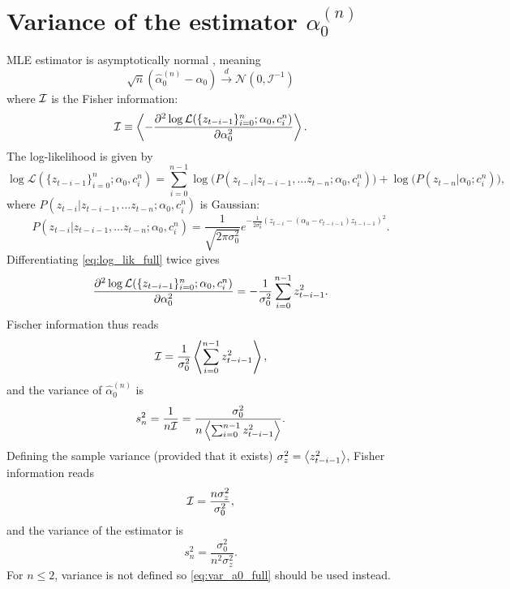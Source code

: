 \documentclass[FinalReport.tex]{subfiles}
\begin{document}
\section{Variance of the estimator ${\alpha}_0^{(n)}$}\label{app:var_a0}
MLE estimator is asymptotically normal \cite{CoxHink74}, meaning
\begin{equation}
	\sqrt{n}(\hat{\alpha}_0^{(n)}-\alpha_0)\stackrel{d}{\rightarrow}\mathcal{N}(0,\mathcal{I}^{-1})
\end{equation}
where $\mathcal{I}$ is the Fisher information:
\begin{equation}
	\mathcal{I}\equiv\expval{-\pdv[2]{\log{\mathcal{L}(\{z_{t-i-1}\}_{i=0}^n;\alpha_0,c_i^n)}}{\alpha_0} }.
\end{equation}
The log-likelihood is given by %
\begin{equation}\label{eq:log_lik_full}
	\log{\mathcal{L}(\{z_{t-i-1}\}_{i=0}^n;\alpha_0,c_i^n)}=\sum_{i=0}^{n-1}\log\bigl(P(z_{t-i}\vert z_{t-i-1},\dots z_{t-n};\alpha_0,c_i^n)\bigr) + \log\bigl(P(z_{t-n}\vert \alpha_0;c_i^n)\bigr),	
\end{equation}
where $P(z_{t-i}\vert z_{t-i-1},\dots z_{t-n};\alpha_0,c_i^n)$ is Gaussian:
\begin{equation}
	P(z_{t-i}\vert z_{t-i-1},\dots z_{t-n};\alpha_0,c_i^n)=\frac{1}{\sqrt{2\pi\sigma_0^2}}e^{-\frac{1}{2\sigma_0^2}(z_{t-i}-(\alpha_0-c_{t-i-1})z_{t-i-1})^2}.
\end{equation}
Differentiating \eqref{eq:log_lik_full} twice gives
\begin{equation}
	\pdv[2]{\log{\mathcal{L}(\{z_{t-i-1}\}_{i=0}^n;\alpha_0,c_i^n)}}{\alpha_0}=-\frac{1}{\sigma_0^2}\sum_{i=0}^{n-1}z_{t-i-1}^2.
\end{equation}
Fischer information thus reads
\begin{equation}
\mathcal{I}=\frac{1}{\sigma_0^2}\expval{\sum_{i=0}^{n-1}z_{t-i-1}^2},	
\end{equation}
and the variance of $\hat{\alpha}_0^{(n)}$ is 
\begin{equation}\label{eq:var_a0_full}
s_n^2=\frac{1}{n\mathcal{I}}=\frac{\sigma_0^2}{n\expval{\sum_{i=0}^{n-1}z_{t-i-1}^2}}.
\end{equation}
Defining the sample variance (provided that it exists) $\sigma_z^2=\expval{z_{t-i-1}^2}$, Fisher information reads
\begin{equation}
	\mathcal{I}=\frac{n\sigma_z^2}{\sigma_0^2},
\end{equation}
and the variance of the estimator is 
\begin{equation}\label{eq:var_a0_norm}
	s_n^2=\frac{\sigma_0^2}{n^2\sigma_z^2}.
\end{equation} 
For $n\leq2$, variance is not defined so \eqref{eq:var_a0_full} should be used instead.



\end{document}
